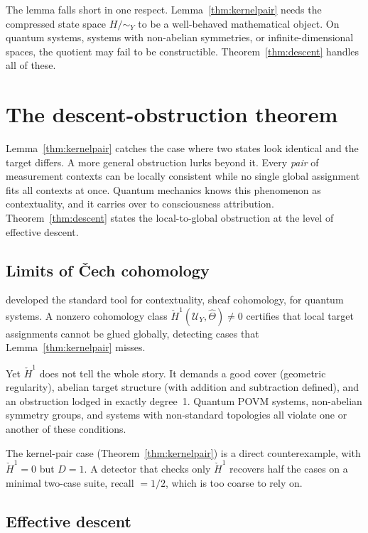 \documentclass[11pt]{article}
\begin{document}
The lemma falls short in one respect. Lemma~\ref{thm:kernelpair} needs the
compressed state space $H/\!\sim_Y$ to be a well-behaved mathematical object. On
quantum systems, systems with non-abelian symmetries, or infinite-dimensional
spaces, the quotient may fail to be constructible. Theorem~\ref{thm:descent}
handles all of these.

\section{The descent-obstruction theorem}
\label{sec:descent}

Lemma~\ref{thm:kernelpair} catches the case where two states look identical and
the target differs. A more general obstruction lurks beyond it. Every
\emph{pair} of measurement contexts can be locally consistent while no single
global assignment fits all contexts at once. Quantum mechanics knows this
phenomenon as contextuality, and it carries over to consciousness attribution.
Theorem~\ref{thm:descent} states the local-to-global obstruction at the level of
effective descent.

\subsection{Limits of \v{C}ech cohomology}
\label{sec:cech}

\citet{abramsky2011} developed the standard tool for contextuality, sheaf
cohomology, for quantum systems. A nonzero cohomology class
$\check{H}^1(\mathcal{U}_Y, \hat\Theta) \neq 0$ certifies that local target
assignments cannot be glued globally, detecting cases that
Lemma~\ref{thm:kernelpair} misses.

Yet $\check{H}^1$ does not tell the whole story. It demands a good cover
(geometric regularity), abelian target structure (with addition and subtraction
defined), and an obstruction lodged in exactly degree~1. Quantum POVM systems,
non-abelian symmetry groups, and systems with non-standard topologies all
violate one or another of these conditions.

The kernel-pair case (Theorem~\ref{thm:kernelpair}) is a direct counterexample,
with $\check{H}^1 = 0$ but $D = 1$. A detector that checks only $\check{H}^1$
recovers half the cases on a minimal two-case suite, recall $= 1/2$, which is
too coarse to rely on.

\subsection{Effective descent}
\label{sec:descent-intuition}
\end{document}
